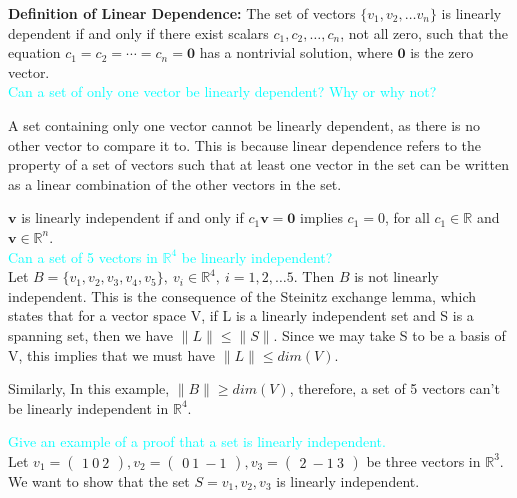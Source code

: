 \documentclass[fontsize=12pt]{scrartcl}
\begin{document}
\noindent
\textbf{Definition of Linear Dependence:} The set of vectors $\{ v_1, v_2, \ldots v_n\}$ is linearly dependent if and only if there exist scalars $c_1, c_2, \ldots, c_n$, not all zero, such that the equation $c_1=c_2=\cdots=c_n=\mathbf{0}$ has a nontrivial solution, where $\mathbf{0}$ is the zero vector. \\

\noindent
\textcolor{cyan}{Can a set of only one vector be linearly dependent? Why or why not?}

A set containing only one vector cannot be linearly dependent, as there is no other vector to compare it to. This is because linear dependence refers to the property of a set of vectors such that at least one vector in the set can be written as a linear combination of the other vectors in the set.

${\textbf{v}}$ is linearly independent if and only if $c_1\textbf{v} = \textbf{0}$ implies $c_1 = 0$, for all $c_1 \in \mathbb{R}$ and $\textbf{v} \in \mathbb{R}^n$.
\\

\noindent
\textcolor{cyan}{Can a set of 5 vectors in $\mathbb{R}^4$ be linearly independent?}\\
Let $B = \{ v_1, v_2, v_3, v_4, v_5\}, \ v_i \in \mathbb{R}^4, \ i = 1, 2, \ldots 5$. Then $B$ is not linearly independent. This is the consequence of the Steinitz exchange lemma, which states that for a vector space V, if L is a linearly independent set and S is a spanning set, then we have $\|L\| \leq \|S\|$. Since we may take S to be a basis of V, this implies that we must have $\|L\| \leq dim(V)$.

\noindent
Similarly, In this example, $\|B\| \geq dim(V)$, therefore, a set of 5 vectors can't be linearly independent in $\mathbb{R}^4$.

\newpage

\noindent
\textcolor{cyan}{Give an example of a proof that a set is linearly independent.}
\\
Let $v_1 = \begin{pmatrix} 1 \ 0 \ 2 \end{pmatrix}, v_2 = \begin{pmatrix} 0 \ 1 \ -1 \end{pmatrix}, v_3 = \begin{pmatrix} 2 \ -1 \ 3 \end{pmatrix}$ be three vectors in $\mathbb{R}^3$. We want to show that the set $S = {v_1, v_2, v_3}$ is linearly independent.
\end{document}
